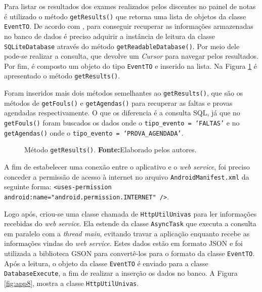 	\par Para listar os resultados dos exames realizados pelos discentes no painel
de notas é utilizado o método \texttt{getResults()} que retorna uma lista de
objetos da classe \texttt{EventTO}. De acordo com ,
para conseguir recuperar as informações armazenadas no banco de dados é preciso
adquirir a instância de leitura da classe \texttt{SQLiteDatabase} através do
método \texttt{getReadableDatabase()}. Por meio dele pode-se realizar a
consulta, que devolve um \textit{Cursor} para navegar pelos resultados. Por
fim, é composto um objeto do tipo \texttt{EventTO} e inserido na lista. Na
Figura \ref{fig:app7} é apresentado o método \texttt{getResults()}.

	\par Foram inseridos mais dois métodos semelhantes ao \texttt{getResults()},
que são os métodos de \texttt{getFouls()} e \texttt{getAgendas()} para
recuperar as faltas e provas agendadas respectivamente. O que os diferencia é a
consulta SQL, já que no \texttt{getFouls()}  foram buscados os dados onde o
\texttt{tipo\_evento = ‘FALTAS'} e no \texttt{getAgendas()} onde o
\texttt{tipo\_evento = ‘PROVA\_AGENDADA'}.

	\begin{figure}[h!] 
		
		\caption[Método getResults()]{Método \texttt{getResults()}.
		\textbf{Fonte:}Elaborado pelos autores.}
		\label{fig:app7}
	\end{figure}
	
	\pagebreak
	
	\par A fim de estabelecer uma conexão entre o aplicativo e o \textit{web
service}, foi preciso conceder a permissão de acesso à internet no arquivo
\texttt{AndroidManifest.xml} da seguinte forma: \texttt{<uses-permission
android:name="android.permission.INTERNET" />}.

	\par Logo após, criou-se uma classe chamada de \texttt{HttpUtilUnivas} para ler
informações recebidas do \textit{web service}. Ela estende da classe
\texttt{AsyncTask} que executa a consulta em paralelo com a \textit{thread
main}, evitando travar a aplicação enquanto recebe as informações vindas do
\textit{web service}. Estes dados estão em formato JSON e foi utilizada a
biblioteca GSON para convertê-los para o formato da classe \texttt{EventTO}.
Após a leitura, o objeto da classe \texttt{EventTO} é enviado para a classe
\texttt{DatabaseExecute}, a fim de realizar a inserção os dados no banco. A
Figura \ref{fig:app8}, mostra a classe \texttt{HttpUtilUnivas}.

